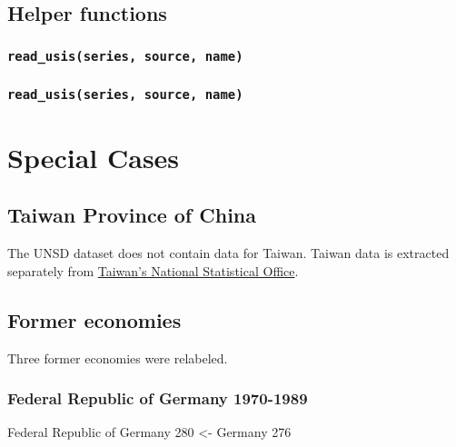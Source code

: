 \documentclass[
]{book}
\begin{document}
\section{Helper functions}\label{helper-functions}

\subsection*{\texorpdfstring{\texttt{read\_usis(series,\ source,\ name)}}{read\_usis(series, source, name)}}\label{read_usisseries-source-name}

\subsection*{\texorpdfstring{\texttt{read\_usis(series,\ source,\ name)}}{read\_usis(series, source, name)}}\label{read_usisseries-source-name-1}

\chapter{Special Cases}\label{special-cases}

\section{Taiwan Province of China}\label{taiwan-province-of-china}

The UNSD dataset does not contain data for Taiwan. Taiwan data is extracted separately from \href{https://nstatdb.dgbas.gov.tw/dgbasall/webMain.aspx?k=engmain}{Taiwan's National Statistical Office}.

\section{Former economies}\label{former-economies}

Three former economies were relabeled.

\subsection*{Federal Republic of Germany 1970-1989}\label{federal-republic-of-germany-1970-1989}

Federal Republic of Germany 280 \textless- Germany 276
\end{document}
